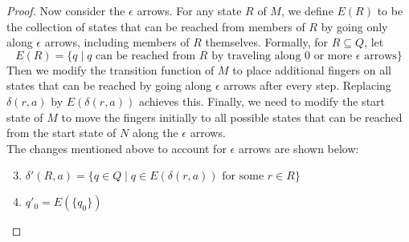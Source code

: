 \documentclass[11pt,a4paper]{article}
\begin{document}
\begin{theorem}
\begin{proof}
        Now consider the $\epsilon$ arrows. For any state $R$ of $M$, we define $E(R)$ to be the collection of states that can be reached from members of $R$ by going only along $\epsilon$ arrows, including members of $R$ themselves.
        Formally, for $R\subseteq Q$, let $$E(R)=\{q\mid q\text{ can be reached from $R$ by traveling along 0 or more $\epsilon$ arrows}\}$$
        Then we modify the transition function of $M$ to place additional fingers on all states that can be reached by going along $\epsilon$ arrows after every step. Replacing $\delta(r,a)$ by $E(\delta(r,a))$ achieves this.
        Finally, we need to modify the start state of $M$ to move the fingers initially to all possible states that can be reached from the start state of $N$ along the $\epsilon$ arrows. \\
        
        The changes mentioned above to account for $\epsilon$ arrows are shown below:
        \begin{enumerate}
            \setcounter{enumi}{2}
            \item $\delta'(R,a)=\{q\in Q\mid q\in E(\delta(r,a))\text{ for some }r\in R\}$
            \item $q'_0=E(\{q_0\})$
        \end{enumerate}
    \end{proof}
\end{theorem}
\end{document}
